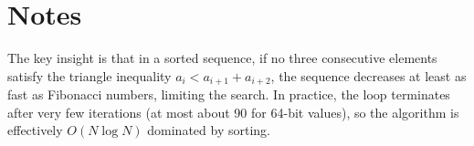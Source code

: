 \documentclass[11pt,a4paper]{article}
\begin{document}
\section{Notes}
The key insight is that in a sorted sequence, if no three consecutive elements satisfy the triangle inequality $a_i < a_{i+1} + a_{i+2}$, the sequence decreases at least as fast as Fibonacci numbers, limiting the search. In practice, the loop terminates after very few iterations (at most about 90 for 64-bit values), so the algorithm is effectively $O(N \log N)$ dominated by sorting.
\end{document}

